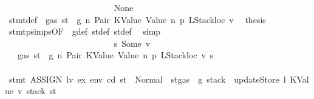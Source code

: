 \begin{isabellebody}
\ \ \ \ \ \ \ \ \ \ \ \ \ \ \ \ \ \ \ \ \ \ \ \ \isamarkupfalse%
\ None\isanewline
\ \ \ \ \ \ \ \ \ \ \ \ \ \ \ \ \ \ \ \ \ \ \ \ \isamarkupfalse%
\ stmt{\isacharunderscore}{\kern0pt}def\ {\isacharbackquoteopen}{\isasymnot}\ gas\ st\ {\isasymle}\ g{\isacharbackquoteclose}\ n\ Pair\ KValue\ Value\ n{}\ p{}\ LStackloc\ v{}\ \isamarkupfalse%
\ {\isacharquery}{\kern0pt}thesis\ \isamarkupfalse%
\ stmt{\isachardot}{\kern0pt}psimps{\isacharparenleft}{\kern0pt}{}{\isacharparenright}{\kern0pt}{\isacharbrackleft}{\kern0pt}OF\ {}{\isacharparenleft}{\kern0pt}{}{\isacharparenright}{\kern0pt}{\isacharbrackright}{\kern0pt}\ g{\isacharunderscore}{\kern0pt}def\ st{\isacharprime}{\kern0pt}{\isacharunderscore}{\kern0pt}def\ st{\isacharprime}{\kern0pt}{\isacharprime}{\kern0pt}{\isacharunderscore}{\kern0pt}def\ \isamarkupfalse%
\ simp\isanewline
\ \ \ \ \ \ \ \ \ \ \ \ \ \ \ \ \ \ \ \ \ \ \isamarkupfalse%
\isanewline
\ \ \ \ \ \ \ \ \ \ \ \ \ \ \ \ \ \ \ \ \ \ \ \ \isamarkupfalse%
\ s{}{\isacharcolon}{\kern0pt}\ {\isacharparenleft}{\kern0pt}Some\ v{\isacharprime}{\kern0pt}{\isacharparenright}{\kern0pt}\isanewline
\ \ \ \ \ \ \ \ \ \ \ \ \ \ \ \ \ \ \ \ \ \ \ \ \isamarkupfalse%
\ {}{\isacharparenleft}{\kern0pt}{}{\isacharparenright}{\kern0pt}\ {\isacharbackquoteopen}{\isasymnot}\ gas\ st\ {\isasymle}\ g{\isacharbackquoteclose}\ n\ Pair\ KValue\ Value\ n{}\ p{}\ LStackloc\ v{}\ s{}\isanewline
\ \ \ \ \ \ \ \ \ \ \ \ \ \ \ \ \ \ \ \ \ \ \ \ \isamarkupfalse%
\ {\isachardoublequoteopen}stmt\ {\isacharparenleft}{\kern0pt}ASSIGN\ lv\ ex{\isacharparenright}{\kern0pt}\ env\ cd\ st\ {\isacharequal}{\kern0pt}\ Normal\ {\isacharparenleft}{\kern0pt}{\isacharparenleft}{\kern0pt}{\isacharparenright}{\kern0pt}{\isacharcomma}{\kern0pt}\ st{\isacharprime}{\kern0pt}{\isacharprime}{\kern0pt}{\isasymlparr}gas\ {\isacharcolon}{\kern0pt}{\isacharequal}{\kern0pt}\ g{\isacharprime}{\kern0pt}{\isacharprime}{\kern0pt}{\isacharcomma}{\kern0pt}\ stack\ {\isacharcolon}{\kern0pt}{\isacharequal}{\kern0pt}\ updateStore\ l\ {\isacharparenleft}{\kern0pt}KValue\ v{\isacharprime}{\kern0pt}{\isacharparenright}{\kern0pt}\ {\isacharparenleft}{\kern0pt}stack\ st{\isacharparenright}{\kern0pt}{\isasymrparr}{\isacharparenright}{\kern0pt}{\isachardoublequoteclose}\isanewline
\ \ \ \ \ \ \ \ \ \ \ \ \ \ \ \ \ \ \ \ \ \ \ \ \ \ \isamarkupfalse%

\end{isabellebody}
